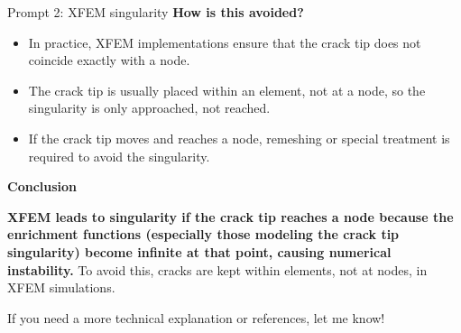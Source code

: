 \documentclass[12pt]{article}
\begin{document}
\begin{summarybox}{Prompt 2: XFEM singularity}
\textbf{How is this avoided?}
\begin{itemize}
    \item In practice, XFEM implementations ensure that the crack tip does not coincide exactly with a node.
    \item The crack tip is usually placed within an element, not at a node, so the singularity is only approached, not reached.
    \item If the crack tip moves and reaches a node, remeshing or special treatment is required to avoid the singularity.
\end{itemize}

\textbf{Conclusion}

\textbf{XFEM leads to singularity if the crack tip reaches a node because the enrichment functions (especially those modeling the crack tip singularity) become infinite at that point, causing numerical instability.}
To avoid this, cracks are kept within elements, not at nodes, in XFEM simulations.

\vspace{1em}
If you need a more technical explanation or references, let me know!

\end{summarybox}
\end{document}
